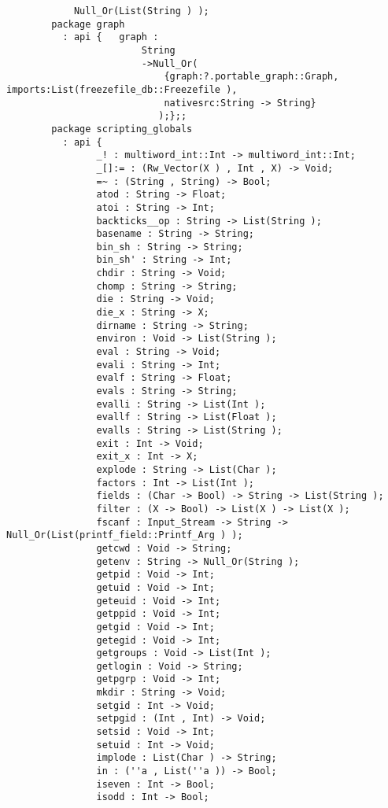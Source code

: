 \begin{verbatim}
            Null_Or(List(String ) );
        package graph
          : api {   graph :
                        String
                        ->Null_Or(
                            {graph:?.portable_graph::Graph, imports:List(freezefile_db::Freezefile ),
                            nativesrc:String -> String}
                           );};;
        package scripting_globals
          : api {
                _! : multiword_int::Int -> multiword_int::Int;
                _[]:= : (Rw_Vector(X ) , Int , X) -> Void;
                =~ : (String , String) -> Bool;
                atod : String -> Float;
                atoi : String -> Int;
                backticks__op : String -> List(String );
                basename : String -> String;
                bin_sh : String -> String;
                bin_sh' : String -> Int;
                chdir : String -> Void;
                chomp : String -> String;
                die : String -> Void;
                die_x : String -> X;
                dirname : String -> String;
                environ : Void -> List(String );
                eval : String -> Void;
                evali : String -> Int;
                evalf : String -> Float;
                evals : String -> String;
                evalli : String -> List(Int );
                evallf : String -> List(Float );
                evalls : String -> List(String );
                exit : Int -> Void;
                exit_x : Int -> X;
                explode : String -> List(Char );
                factors : Int -> List(Int );
                fields : (Char -> Bool) -> String -> List(String );
                filter : (X -> Bool) -> List(X ) -> List(X );
                fscanf : Input_Stream -> String -> Null_Or(List(printf_field::Printf_Arg ) );
                getcwd : Void -> String;
                getenv : String -> Null_Or(String );
                getpid : Void -> Int;
                getuid : Void -> Int;
                geteuid : Void -> Int;
                getppid : Void -> Int;
                getgid : Void -> Int;
                getegid : Void -> Int;
                getgroups : Void -> List(Int );
                getlogin : Void -> String;
                getpgrp : Void -> Int;
                mkdir : String -> Void;
                setgid : Int -> Void;
                setpgid : (Int , Int) -> Void;
                setsid : Void -> Int;
                setuid : Int -> Void;
                implode : List(Char ) -> String;
                in : (''a , List(''a )) -> Bool;
                iseven : Int -> Bool;
                isodd : Int -> Bool;

\end{verbatim}
